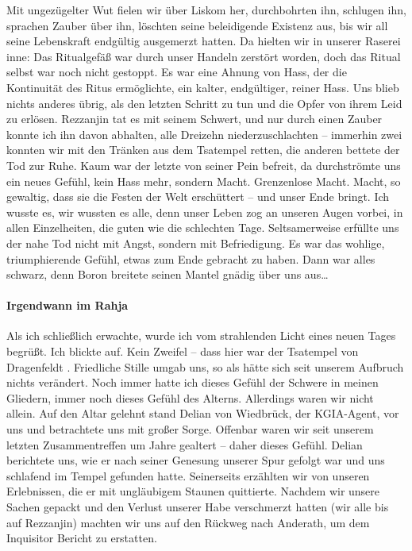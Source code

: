 Mit ungezügelter Wut fielen wir über Liskom her, durchbohrten ihn, schlugen ihn, sprachen Zauber über ihn, löschten seine beleidigende Existenz aus, bis wir all seine Lebenskraft endgültig ausgemerzt hatten. Da hielten wir in unserer Raserei inne: Das Ritualgefäß war durch unser Handeln zerstört worden, doch das Ritual selbst war noch nicht gestoppt. Es war eine Ahnung von Hass, der die Kontinuität des Ritus ermöglichte, ein kalter, endgültiger, reiner Hass. Uns blieb nichts anderes übrig, als den letzten Schritt zu tun und die Opfer von ihrem Leid zu erlösen. Rezzanjin tat es mit seinem Schwert, und nur durch einen Zauber konnte ich ihn davon abhalten, alle Dreizehn niederzuschlachten -- immerhin zwei konnten wir mit den Tränken aus dem Tsatempel retten, die anderen bettete der Tod zur Ruhe. Kaum war der letzte von seiner Pein befreit, da durchströmte uns ein neues Gefühl, kein Hass mehr, sondern Macht. Grenzenlose Macht. Macht, so gewaltig, dass sie die Festen der Welt erschüttert -- und unser Ende bringt. Ich wusste es, wir wussten es alle, denn unser Leben zog an unseren Augen vorbei, in allen Einzelheiten, die guten wie die schlechten Tage. Seltsamerweise erfüllte uns der nahe Tod nicht mit Angst, sondern mit Befriedigung. Es war das wohlige, triumphierende Gefühl, etwas zum Ende gebracht zu haben. Dann war alles schwarz, denn Boron breitete seinen Mantel gnädig über uns aus\dots

\paragraph{Irgendwann im Rahja}
Als ich schließlich erwachte, wurde ich vom strahlenden Licht eines neuen Tages begrüßt. Ich blickte auf. Kein Zweifel -- dass hier war der Tsatempel von Dragenfeldt . Friedliche Stille umgab uns, so als hätte sich seit unserem Aufbruch nichts verändert. Noch immer hatte ich dieses Gefühl der Schwere in meinen Gliedern, immer noch dieses Gefühl des Alterns. Allerdings waren wir nicht allein. Auf den Altar gelehnt stand Delian von Wiedbrück, der KGIA-Agent, vor uns und betrachtete uns mit großer Sorge. Offenbar waren wir seit unserem letzten Zusammentreffen um Jahre gealtert -- daher dieses Gefühl. Delian berichtete uns, wie er nach seiner Genesung unserer Spur gefolgt war und uns schlafend im Tempel gefunden hatte. Seinerseits erzählten wir von unseren Erlebnissen, die er mit ungläubigem Staunen quittierte. Nachdem wir unsere Sachen gepackt und den Verlust unserer Habe verschmerzt hatten (wir alle bis auf Rezzanjin) machten wir uns auf den Rückweg nach Anderath, um dem Inquisitor Bericht zu erstatten.


